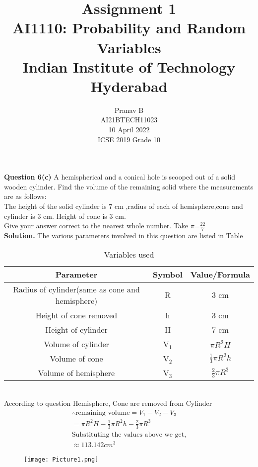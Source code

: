 \documentclass[journal,12pt,twocolumn]{IEEEtran}
\title{Assignment 1 \\ \Large AI1110: Probability and Random Variables \\ \large Indian Institute of Technology Hyderabad}
\author{Pranav B \\ \normalsize AI21BTECH11023 \\ \vspace*{20pt} \normalsize  10 April 2022 \\ \vspace*{20pt} \Large ICSE 2019 Grade 10}
\begin{document}
	\maketitle
	
	\textbf{Question 6(c)} 
	A hemispherical and a conical hole is scooped out of a solid wooden cylinder. Find the volume of the remaining solid where the measurements are as follows:\\
	The height of the solid cylinder is 7 cm ,radius of each of hemisphere,cone and cylinder is 3 cm. Height of cone is 3 cm.\\
	Give your answer correct to the nearest whole number. Take $\pi$=$\frac{22}{7}$\\
	\textbf{Solution.}
	The various parameters involved in this question are listed in Table\\ \begin{table}[h]
\caption{Variables used}
\begin{tabular}{|c |c|c|}
\hline 
\textbf{Parameter} & \textbf{Symbol} & \textbf{Value/Formula}\\
\hline
Radius of cylinder(same as cone and hemisphere) & R & 3 cm\\
\hline
Height of cone removed & h & 3 cm\\
\hline
Height of cylinder & H & 7 cm\\
\hline
Volume of cylinder & V$_1$ & $\pi R^2 H$\\
\hline
Volume of cone  & V$_2$ & $\frac{1}{3} \pi R^2 h$\\
\hline
Volume of hemisphere & V$_3$ & $\frac{2}{3} \pi R^3$\\
\hline
\end{tabular}
\end{table}
\\
According to question Hemisphere, Cone are removed from Cylinder\\
\begin{align}
\therefore \text{remaining volume} = V_1-V_2-V_3
\\
=\pi R^2 H - \frac{1}{3} \pi R^2 h - \frac{2}{3} \pi R^3
\\
\text{Substituting the values above  we get,}
\nonumber
\\
\approx113.142 cm^3
\nonumber
\end{align}
\begin{figure}[ht!]
\begin{flushright}
\texttt{[image: Picture1.png]}
\end{flushright}
\end{figure}		
\end{document}
